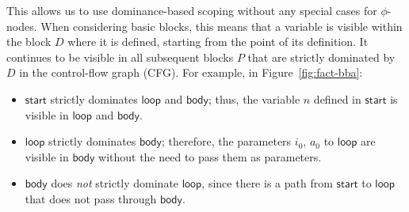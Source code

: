 \documentclass[acmsmall,screen,review]{acmart}
\newcommand{\ms}[1]{\ensuremath{\mathsf{#1}}}
\begin{document}
This allows us to use dominance-based scoping without any special cases for $\phi$-nodes.
When considering basic blocks, this means that a variable is visible within the block $D$ where it
is defined, starting from the point of its definition. It continues to be visible in all subsequent
blocks $P$ that are strictly dominated by $D$ in the control-flow graph (CFG). For example, in
Figure~\ref{fig:fact-bba}:
\begin{itemize}
  \item \ms{start} strictly dominates \ms{loop} and \ms{body}; thus, the variable $n$ defined in
  \ms{start} is visible in \ms{loop} and \ms{body}.
  \item \ms{loop} strictly dominates \ms{body}; therefore, the parameters $i_0$, $a_0$ to \ms{loop}
  are visible in \ms{body} without the need to pass them as parameters.
  \item \ms{body} does \emph{not} strictly dominate \ms{loop}, since there is a path from \ms{start}
  to \ms{loop} that does not pass through \ms{body}.
\end{itemize}
\end{document}
